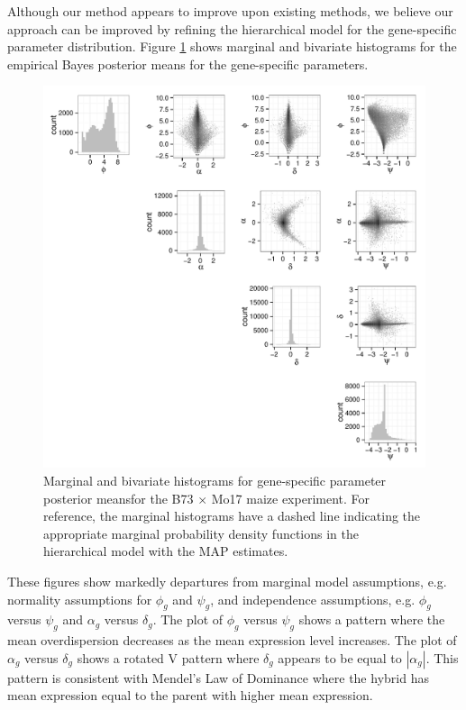 \documentclass[useAMS,usenatbib,referee]{biom}
\begin{document}
Although our method appears to improve upon existing methods, we believe our approach can be improved by refining the hierarchical model for the gene-specific parameter distribution. Figure \ref{f:scatterplot} shows marginal and bivariate histograms for the empirical Bayes posterior means for the gene-specific parameters. 
\begin{figure}
\centerline{\includegraphics[width=\textwidth]{estimates}}
\caption{Marginal and bivariate histograms for gene-specific parameter posterior meansfor the B73 $\times$ Mo17 maize experiment. For reference, the marginal histograms have a dashed line indicating the appropriate marginal probability density functions in the hierarchical model with the MAP estimates.}
\label{f:scatterplot}
\end{figure}
These figures show markedly departures from marginal model assumptions, e.g. normality assumptions for $\phi_g$ and $\psi_g$, and independence assumptions, e.g. $\phi_g$ versus $\psi_g$ and $\alpha_g$ versus $\delta_g$. The plot of $\phi_g$ versus $\psi_g$ shows a pattern where the mean overdispersion decreases as the mean expression level increases. The plot of $\alpha_g$ versus $\delta_g$ shows a rotated V pattern where $\delta_g$ appears to be equal to $|\alpha_g|$. This pattern is consistent with Mendel's Law of Dominance where the hybrid has mean expression equal to the parent with higher mean expression. 
\end{document}
